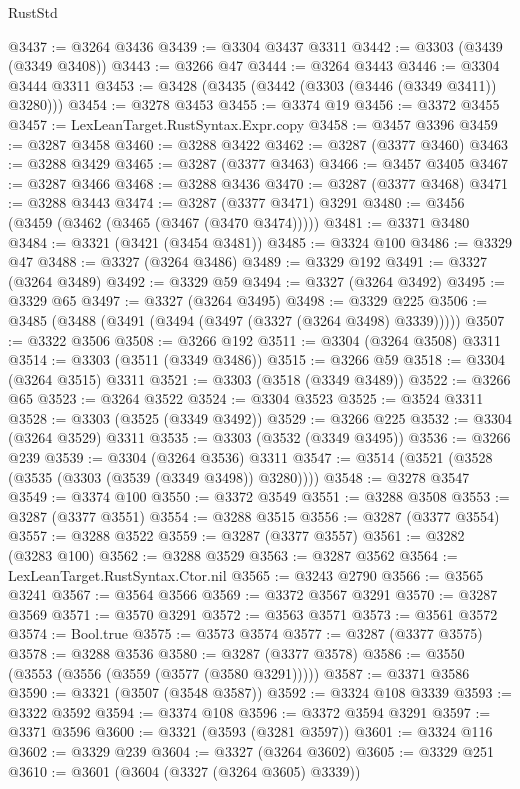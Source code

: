 \begin{lexlean}{RustStd}
\begin{coremodule}
@3437 := @3264 @3436
@3439 := @3304 @3437 @3311
@3442 := @3303 (@3439 (@3349 @3408))
@3443 := @3266 @47
@3444 := @3264 @3443
@3446 := @3304 @3444 @3311
@3453 := @3428 (@3435 (@3442 (@3303 (@3446 (@3349 @3411)) @3280)))
@3454 := @3278 @3453
@3455 := @3374 @19
@3456 := @3372 @3455
@3457 := LexLeanTarget.RustSyntax.Expr.copy
@3458 := @3457 @3396
@3459 := @3287 @3458
@3460 := @3288 @3422
@3462 := @3287 (@3377 @3460)
@3463 := @3288 @3429
@3465 := @3287 (@3377 @3463)
@3466 := @3457 @3405
@3467 := @3287 @3466
@3468 := @3288 @3436
@3470 := @3287 (@3377 @3468)
@3471 := @3288 @3443
@3474 := @3287 (@3377 @3471) @3291
@3480 := @3456 (@3459 (@3462 (@3465 (@3467 (@3470 @3474)))))
@3481 := @3371 @3480
@3484 := @3321 (@3421 (@3454 @3481))
@3485 := @3324 @100
@3486 := @3329 @47
@3488 := @3327 (@3264 @3486)
@3489 := @3329 @192
@3491 := @3327 (@3264 @3489)
@3492 := @3329 @59
@3494 := @3327 (@3264 @3492)
@3495 := @3329 @65
@3497 := @3327 (@3264 @3495)
@3498 := @3329 @225
@3506 := @3485 (@3488 (@3491 (@3494 (@3497 (@3327 (@3264 @3498) @3339)))))
@3507 := @3322 @3506
@3508 := @3266 @192
@3511 := @3304 (@3264 @3508) @3311
@3514 := @3303 (@3511 (@3349 @3486))
@3515 := @3266 @59
@3518 := @3304 (@3264 @3515) @3311
@3521 := @3303 (@3518 (@3349 @3489))
@3522 := @3266 @65
@3523 := @3264 @3522
@3524 := @3304 @3523
@3525 := @3524 @3311
@3528 := @3303 (@3525 (@3349 @3492))
@3529 := @3266 @225
@3532 := @3304 (@3264 @3529) @3311
@3535 := @3303 (@3532 (@3349 @3495))
@3536 := @3266 @239
@3539 := @3304 (@3264 @3536) @3311
@3547 := @3514 (@3521 (@3528 (@3535 (@3303 (@3539 (@3349 @3498)) @3280))))
@3548 := @3278 @3547
@3549 := @3374 @100
@3550 := @3372 @3549
@3551 := @3288 @3508
@3553 := @3287 (@3377 @3551)
@3554 := @3288 @3515
@3556 := @3287 (@3377 @3554)
@3557 := @3288 @3522
@3559 := @3287 (@3377 @3557)
@3561 := @3282 (@3283 @100)
@3562 := @3288 @3529
@3563 := @3287 @3562
@3564 := LexLeanTarget.RustSyntax.Ctor.nil
@3565 := @3243 @2790
@3566 := @3565 @3241
@3567 := @3564 @3566
@3569 := @3372 @3567 @3291
@3570 := @3287 @3569
@3571 := @3570 @3291
@3572 := @3563 @3571
@3573 := @3561 @3572
@3574 := Bool.true
@3575 := @3573 @3574
@3577 := @3287 (@3377 @3575)
@3578 := @3288 @3536
@3580 := @3287 (@3377 @3578)
@3586 := @3550 (@3553 (@3556 (@3559 (@3577 (@3580 @3291)))))
@3587 := @3371 @3586
@3590 := @3321 (@3507 (@3548 @3587))
@3592 := @3324 @108 @3339
@3593 := @3322 @3592
@3594 := @3374 @108
@3596 := @3372 @3594 @3291
@3597 := @3371 @3596
@3600 := @3321 (@3593 (@3281 @3597))
@3601 := @3324 @116
@3602 := @3329 @239
@3604 := @3327 (@3264 @3602)
@3605 := @3329 @251
@3610 := @3601 (@3604 (@3327 (@3264 @3605) @3339))

\end{coremodule}
\end{lexlean}
